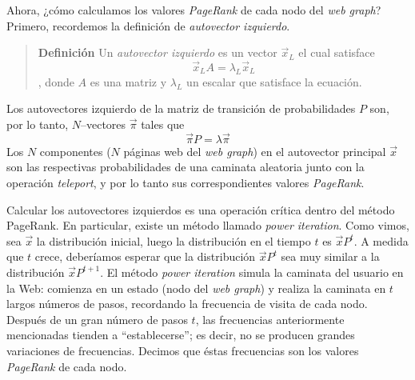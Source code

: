 			Ahora, ¿cómo calculamos los valores \textit{PageRank} de cada nodo del \textit{web graph}? Primero, recordemos la definición de \textit{autovector izquierdo}.
			\begin{quote}
				\textbf{Definición} Un \textit{autovector izquierdo} es un vector $\vec{x}_L$ el cual satisface 
					\begin{equation}
						\vec{x}_LA = \lambda_L\vec{x}_L
					\end{equation}
				, donde $A$ es una matriz y $\lambda_L$ un escalar que satisface la ecuación.
			\end{quote}
			Los autovectores izquierdo de la matriz de transición de probabilidades $P$ son, por lo tanto, $N$--vectores $\vec{\pi}$ tales que
			\begin{equation}
				\vec{\pi}P = \lambda \vec{\pi}
			\end{equation}
			Los $N$ componentes ($N$ páginas web del \textit{web graph}) en el autovector principal $\vec{x}$ son las respectivas probabilidades de una caminata aleatoria junto con la operación \textit{teleport}, y por lo tanto sus correspondientes valores \textit{PageRank}. \par
			
			Calcular los autovectores izquierdos es una operación crítica dentro del método PageRank. En particular, existe un método llamado \textit{power iteration}. Como vimos, sea $\vec{x}$ la distribución inicial, luego la distribución en el tiempo $t$ es $\vec{x}P^{t}$. A medida que $t$ crece, deberíamos esperar que la distribución $\vec{x}P^{t}$ sea muy similar a la distribución $\vec{x}P^{t + 1}$. El método \textit{power iteration} simula la caminata del usuario en la Web: comienza en un estado (nodo del \textit{web graph}) y realiza la caminata en $t$ largos números de pasos, recordando la frecuencia de visita de cada nodo. Después de un gran número de pasos $t$, las frecuencias anteriormente mencionadas tienden a \enquote{establecerse}; es decir, no se producen grandes variaciones de frecuencias. Decimos que éstas frecuencias son los valores \textit{PageRank} de cada nodo.
			
